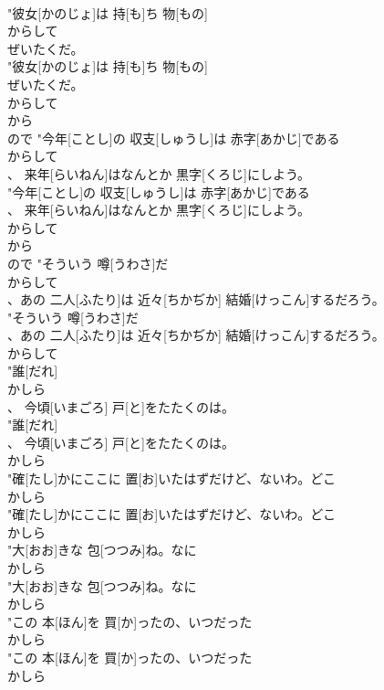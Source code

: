 \documentclass[8pt]{extreport}
\begin{document}
\begin{CJK}{UTF8}{min}
\\	"彼女[かのじょ]は 持[も]ち 物[もの]
\\	からして
\\	ぜいたくだ。
\\	"彼女[かのじょ]は 持[も]ち 物[もの]
\\	ぜいたくだ。
\\	からして
\\	から 
\\	ので	"今年[ことし]の 収支[しゅうし]は 赤字[あかじ]である
\\	からして
\\	、 来年[らいねん]はなんとか 黒字[くろじ]にしよう。
\\	"今年[ことし]の 収支[しゅうし]は 赤字[あかじ]である
\\	、 来年[らいねん]はなんとか 黒字[くろじ]にしよう。
\\	からして
\\	から 
\\	ので	"そういう 噂[うわさ]だ
\\	からして
\\	、あの 二人[ふたり]は 近々[ちかぢか] 結婚[けっこん]するだろう。
\\	"そういう 噂[うわさ]だ
\\	、あの 二人[ふたり]は 近々[ちかぢか] 結婚[けっこん]するだろう。
\\	からして
\\	"誰[だれ]
\\	かしら
\\	、 今頃[いまごろ] 戸[と]をたたくのは。
\\	"誰[だれ]
\\	、 今頃[いまごろ] 戸[と]をたたくのは。
\\	かしら
\\	"確[たし]かにここに 置[お]いたはずだけど、ないわ。どこ
\\	かしら
\\	"確[たし]かにここに 置[お]いたはずだけど、ないわ。どこ
\\	かしら
\\	"大[おお]きな 包[つつみ]ね。なに
\\	かしら
\\	"大[おお]きな 包[つつみ]ね。なに
\\	かしら
\\	"この 本[ほん]を 買[か]ったの、いつだった
\\	かしら
\\	"この 本[ほん]を 買[か]ったの、いつだった
\\	かしら

\end{CJK}
\end{document}
